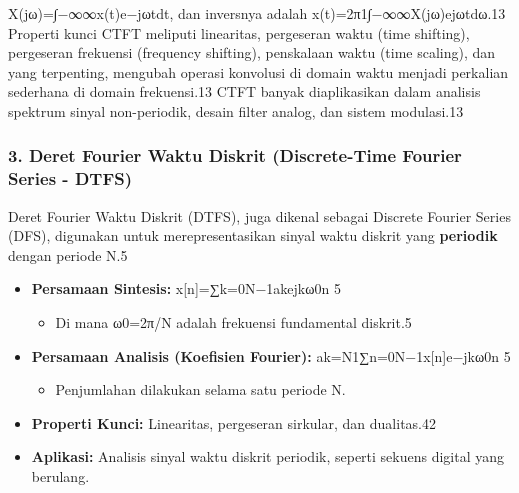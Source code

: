 \documentclass[
  letterpaper,
  DIV=11,
  numbers=noendperiod]{scrreprt}
\providecommand{\tightlist}{%
  \setlength{\itemsep}{0pt}\setlength{\parskip}{0pt}}\usepackage{longtable,booktabs,array}
\begin{document}
X(jω)=∫−∞∞\hspace{0pt}x(t)e−jωtdt, dan inversnya adalah
x(t)=2π1\hspace{0pt}∫−∞∞\hspace{0pt}X(jω)ejωtdω.13 Properti kunci CTFT
meliputi linearitas, pergeseran waktu (time shifting), pergeseran
frekuensi (frequency shifting), penskalaan waktu (time scaling), dan
yang terpenting, mengubah operasi konvolusi di domain waktu menjadi
perkalian sederhana di domain frekuensi.13 CTFT banyak diaplikasikan
dalam analisis spektrum sinyal non-periodik, desain filter analog, dan
sistem modulasi.13

\subsubsection{3. Deret Fourier Waktu Diskrit (Discrete-Time Fourier
Series -
DTFS)}\label{deret-fourier-waktu-diskrit-discrete-time-fourier-series---dtfs}

Deret Fourier Waktu Diskrit (DTFS), juga dikenal sebagai Discrete
Fourier Series (DFS), digunakan untuk merepresentasikan sinyal waktu
diskrit yang \textbf{periodik} dengan periode N.5

\begin{itemize}
\item
  \textbf{Persamaan Sintesis:}
  x{[}n{]}=∑k=0N−1\hspace{0pt}ak\hspace{0pt}ejkω0\hspace{0pt}n 5

  \begin{itemize}
  \tightlist
  \item
    Di mana ω0\hspace{0pt}=2π/N adalah frekuensi fundamental diskrit.5
  \end{itemize}
\item
  \textbf{Persamaan Analisis (Koefisien Fourier):}
  ak\hspace{0pt}=N1\hspace{0pt}∑n=0N−1\hspace{0pt}x{[}n{]}e−jkω0\hspace{0pt}n
  5

  \begin{itemize}
  \tightlist
  \item
    Penjumlahan dilakukan selama satu periode N.
  \end{itemize}
\item
  \textbf{Properti Kunci:} Linearitas, pergeseran sirkular, dan
  dualitas.42
\item
  \textbf{Aplikasi:} Analisis sinyal waktu diskrit periodik, seperti
  sekuens digital yang berulang.
\end{itemize}
\end{document}
